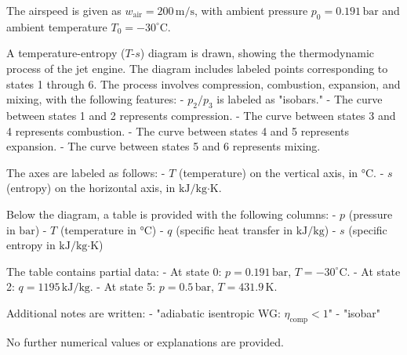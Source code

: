 The airspeed is given as \( w_{\text{air}} = 200 \, \text{m/s} \), with ambient pressure \( p_0 = 0.191 \, \text{bar} \) and ambient temperature \( T_0 = -30^\circ\text{C} \).  

A temperature-entropy (\( T \)-\( s \)) diagram is drawn, showing the thermodynamic process of the jet engine. The diagram includes labeled points corresponding to states 1 through 6. The process involves compression, combustion, expansion, and mixing, with the following features:  
- \( p_2/p_3 \) is labeled as "isobars."  
- The curve between states 1 and 2 represents compression.  
- The curve between states 3 and 4 represents combustion.  
- The curve between states 4 and 5 represents expansion.  
- The curve between states 5 and 6 represents mixing.  

The axes are labeled as follows:  
- \( T \) (temperature) on the vertical axis, in \( \text{°C} \).  
- \( s \) (entropy) on the horizontal axis, in \( \text{kJ/kg·K} \).  

Below the diagram, a table is provided with the following columns:  
- \( p \) (pressure in \( \text{bar} \))  
- \( T \) (temperature in \( \text{°C} \))  
- \( q \) (specific heat transfer in \( \text{kJ/kg} \))  
- \( s \) (specific entropy in \( \text{kJ/kg·K} \))  

The table contains partial data:  
- At state 0: \( p = 0.191 \, \text{bar} \), \( T = -30^\circ\text{C} \).  
- At state 2: \( q = 1195 \, \text{kJ/kg} \).  
- At state 5: \( p = 0.5 \, \text{bar} \), \( T = 431.9 \, \text{K} \).  

Additional notes are written:  
- "adiabatic isentropic WG: \( \eta_{\text{comp}} < 1 \)"  
- "isobar"  

No further numerical values or explanations are provided.